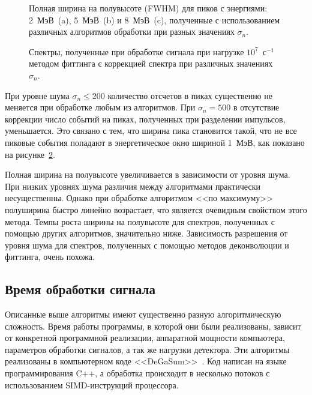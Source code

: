 \begin{figure}[ht!]
  \caption{ Полная ширина на полувысоте (FWHM) для пиков с энергиями: 2~МэВ~(a), 5~МэВ~(b) и 8~МэВ~(c), полученные с использованием различных алгоритмов обработки при разных значениях $\sigma_n$.~\cite{Khilkevitch2020} }
  \label{fig:processingNoiceByWindowFwhm}
\end{figure}

\begin{figure}[ht!]
  \caption{ Спектры, полученные при обработке сигнала при нагрузке $10^7$~с${}^{-1}$ методом фиттинга с коррекцией спектра при различных значениях $\sigma_n$.~\cite{Khilkevitch2020} }
  \label{fig:processingSpectrumCmpByNoice}
\end{figure}


При уровне шума $\sigma_n \le 200$ количество отсчетов в пиках существенно не меняется при обработке любым из алгоритмов. При $\sigma_n = 500$ в отсутствие коррекции число событий на пиках, полученных при разделении импульсов, уменьшается. Это связано с тем, что ширина пика становится такой, что не все пиковые события попадают в энергетическое окно шириной 1~МэВ, как показано на рисунке~\ref{fig:processingSpectrumCmpByNoice}.

Полная ширина на полувысоте увеличивается в зависимости от уровня шума. При низких уровнях шума различия между алгоритмами практически несущественны. Однако при обработке алгоритмом <<по максимуму>> полуширина быстро линейно возрастает, что является очевидным свойством этого метода. Темпы роста ширины на полувысоте для спектров, полученных с помощью других алгоритмов, значительно ниже. Зависимость разрешения от уровня шума для спектров, полученных с помощью методов деконволюции и фиттинга, очень похожа.~\cite{Khilkevitch2020}


\subsection{Время обработки сигнала}

Описанные выше алгоритмы имеют существенно разную алгоритмическую сложность. Время работы программы, в которой они были реализованы, зависит от конкретной программной реализации, аппаратной мощности компьютера, параметров обработки сигналов, а так же нагрузки детектора. Эти алгоритмы реализованы в компьютерном коде <<DeGaSum>>~\cite{Khilkevitch2020}. Код написан на языке программирования C++, а обработка происходит в несколько потоков с использованием SIMD-инструкций процессора.

